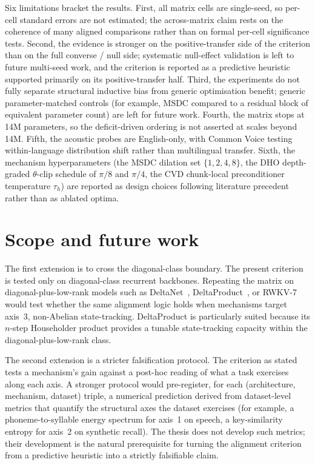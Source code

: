 Six limitations bracket the results. First, all matrix cells are
single-seed, so per-cell standard errors are not estimated; the
across-matrix claim rests on the coherence of many aligned
comparisons rather than on formal per-cell significance tests.
Second, the evidence is stronger on the positive-transfer side
of the criterion than on the full converse / null side;
systematic null-effect validation is left to future multi-seed
work, and the criterion is reported as a predictive heuristic
supported primarily on its positive-transfer half. Third, the
experiments do not fully separate structural inductive bias from
generic optimisation benefit; generic parameter-matched controls
(for example, MSDC compared to a residual block of equivalent
parameter count) are left for future work. Fourth, the matrix
stops at 14M parameters, so the deficit-driven ordering is not
asserted at scales beyond 14M. Fifth, the acoustic probes are
English-only, with Common Voice testing within-language
distribution shift rather than multilingual transfer. Sixth, the
mechanism hyperparameters (the MSDC dilation set
$\{1, 2, 4, 8\}$, the DHO depth-graded $\theta$-clip schedule of
$\pi/8$ and $\pi/4$, the CVD chunk-local preconditioner
temperature $\tau_{h}$) are reported as design choices following
literature precedent rather than as ablated optima.

\section{Scope and future work}\label{sec:conclusions:future-work}

The first extension is to cross the diagonal-class boundary. The
present criterion is tested only on diagonal-class recurrent
backbones. Repeating the matrix on diagonal-plus-low-rank models
such as DeltaNet~\cite{schlag2021deltanet, yang2024deltanet},
DeltaProduct~\cite{siems2025deltaproduct}, or
RWKV-7~\cite{peng2025rwkv7} would test whether the same alignment
logic holds when mechanisms target axis~3, non-Abelian
state-tracking. DeltaProduct is particularly suited because its
$n$-step Householder product provides a tunable state-tracking
capacity within the diagonal-plus-low-rank class.

The second extension is a stricter falsification protocol. The
criterion as stated tests a mechanism's gain against a post-hoc
reading of what a task exercises along each axis. A stronger
protocol would pre-register, for each
(architecture, mechanism, dataset) triple, a numerical prediction
derived from dataset-level metrics that quantify the structural
axes the dataset exercises (for example, a phoneme-to-syllable
energy spectrum for axis~1 on speech, a key-similarity entropy
for axis~2 on synthetic recall). The thesis does not develop
such metrics; their development is the natural prerequisite for
turning the alignment criterion from a predictive heuristic into
a strictly falsifiable claim.

